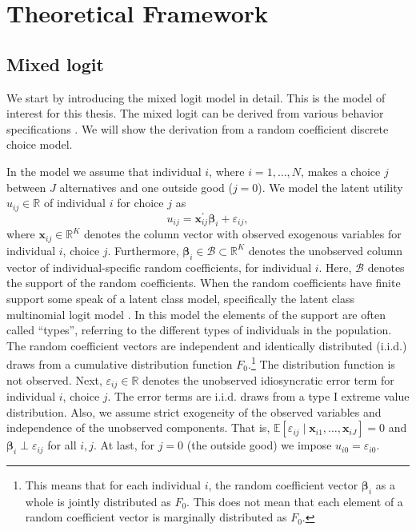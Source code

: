 \section{Theoretical Framework}
\label{sec:theory}
\subsection{Mixed logit}
\label{sec:mxl}
We start by introducing the mixed logit model in detail.
This is the model of interest for this thesis.
The mixed logit can be derived from various behavior specifications \citep{Train2009}.
We will show the derivation from a random coefficient discrete choice model.

In the model we assume that individual $i$, where $i = 1,\ldots,N$, makes a choice $j$ between $J$ alternatives and one outside good ($j=0$).
We model the latent utility $u_{ij}\in\mathbb{R}$ of individual $i$ for choice $j$ as
\begin{equation}
\label{eq:mxllatentutil}
    u_{ij} = \bm{x}_{ij}^\prime \bm{\beta}_{i} + \varepsilon_{ij},
\end{equation}
where $\bm{x}_{ij} \in \mathbb{R}^K$ denotes the column vector with observed exogenous variables for individual $i$, choice $j$.
Furthermore, $\bm{\beta}_{i}\in \mathcal{B} \subset \mathbb{R}^K$ denotes the unobserved column vector of individual-specific random coefficients, for individual $i$. 
Here, $\mathcal{B}$ denotes the support of the random coefficients.
When the random coefficients have finite support some speak of a latent class model, specifically the latent class multinomial logit model \citep{Train2009}.
In this model the elements of the support are often called ``types'', referring to the different types of individuals in the population.
The random coefficient vectors are independent and identically distributed (i.i.d.) draws from a cumulative distribution function $F_0$.\footnote{This means that for each individual $i$, the random coefficient vector $\bm{\beta}_{i}$ as a whole is jointly distributed as $F_0$. This does not mean that each element of a random coefficient vector is marginally distributed as $F_0$.}
The distribution function is not observed.
Next, $\varepsilon_{ij}\in \mathbb{R}$ denotes the unobserved idiosyncratic error term for individual $i$, choice $j$. 
The error terms are i.i.d. draws from a type I extreme value distribution.
Also, we assume strict exogeneity of the observed variables and independence of the unobserved components.
That is, $\mathbb{E}[\varepsilon_{ij}\mid \bm{x}_{i1}, \ldots,\bm{x}_{iJ}] = 0$ and $\bm{\beta}_i \perp \varepsilon_{ij}$ for all $i,j$.
At last, for $j=0$ (the outside good) we impose $u_{i0} = \varepsilon_{i0}$.

